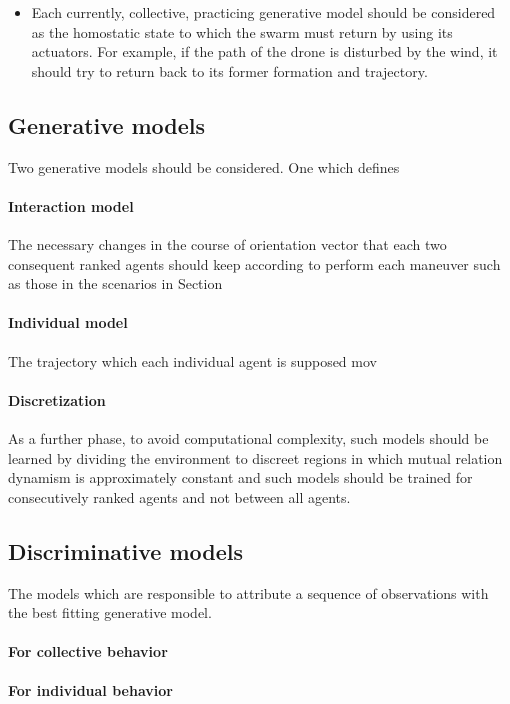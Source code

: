 \documentclass{article}
\begin{document}
			\begin{itemize}
				\item Each currently, collective, practicing generative model should be considered as the homostatic state to which the swarm must return by using its actuators. For example, if the path of the drone is disturbed by the wind, it should try to return back to its former formation and trajectory. 
			\end{itemize}
	
		\subsection{Generative models}\label{sec:generative-collective-models}
			Two generative models should be considered. One which defines 
			\paragraph{Interaction model}
			The necessary changes in the course of orientation vector that each two consequent ranked agents should keep according to perform each maneuver such as those in the scenarios in Section 
			\paragraph{Individual model}
			The trajectory which each individual agent is supposed mov
				
			\paragraph{Discretization} As a further phase, to avoid computational complexity, such models should be learned by dividing the environment to discreet regions in which mutual relation dynamism is approximately constant and such models should be trained for consecutively ranked agents and not between all agents.   
		
		\subsection{Discriminative models}
			The models which are responsible to attribute a sequence of observations with the best fitting generative model.
			\paragraph{For collective behavior}
			\paragraph{For individual behavior}
				
\end{document}
